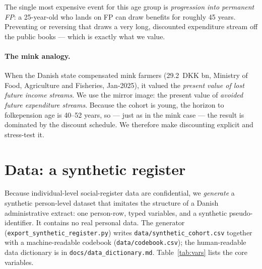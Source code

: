 \documentclass[11pt,a4paper]{article}
\newcommand{\dkk}[1]{\SI{#1}{DKK}}
\begin{document}
The single most expensive event for this age group is \emph{progression into
permanent FP}: a 25-year-old who lands on FP can draw benefits for roughly
45 years. Preventing or reversing that draws a very long, discounted
expenditure stream off the public books --- which is exactly what we value.

\paragraph{The mink analogy.}
When the Danish state compensated mink farmers (\dkk{29.2} bn, Ministry of
Food, Agriculture and Fisheries, Jan-2025), it valued the \emph{present value
of lost future income streams}. We use the mirror image: the present value of
\emph{avoided future expenditure streams}. Because the cohort is young, the
horizon to folkepension age is 40--52 years, so --- just as in the mink case
--- the result is dominated by the discount schedule. We therefore make
discounting explicit and stress-test it.

\section{Data: a synthetic register}
Because individual-level social-register data are confidential, we
\emph{generate} a synthetic person-level dataset that imitates the structure of
a Danish administrative extract: one person-row, typed variables, and a
synthetic pseudo-identifier. It contains no real personal data. The generator
(\texttt{export\_synthetic\_register.py}) writes
\texttt{data/synthetic\_cohort.csv} together with a machine-readable codebook
(\texttt{data/codebook.csv}); the human-readable data dictionary is in
\texttt{docs/data\_dictionary.md}. Table~\ref{tab:vars} lists the core
variables.
\end{document}
